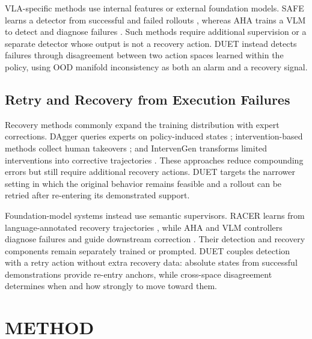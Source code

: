 \documentclass[letterpaper, 10 pt, conference]{ieeeconf}
\begin{document}
VLA-specific methods use internal features or external foundation models. SAFE learns a detector from successful and failed rollouts \cite{safe}, whereas AHA trains a VLM to detect and diagnose failures \cite{aha}. Such methods require additional supervision or a separate detector whose output is not a recovery action. DUET instead detects failures through disagreement between two action spaces learned within the policy, using OOD manifold inconsistency as both an alarm and a recovery signal.

\subsection{Retry and Recovery from Execution Failures}
Recovery methods commonly expand the training distribution with expert corrections. DAgger queries experts on policy-induced states \cite{dagger}; intervention-based methods collect human takeovers \cite{eil,sirius}; and IntervenGen transforms limited interventions into corrective trajectories \cite{intervengen}. These approaches reduce compounding errors but still require additional recovery actions. DUET targets the narrower setting in which the original behavior remains feasible and a rollout can be retried after re-entering its demonstrated support.

Foundation-model systems instead use semantic supervisors. RACER learns from language-annotated recovery trajectories \cite{racer}, while AHA and VLM controllers diagnose failures and guide downstream correction \cite{aha,vlmrecovery}. Their detection and recovery components remain separately trained or prompted. DUET couples detection with a retry action without extra recovery data: absolute states from successful demonstrations provide re-entry anchors, while cross-space disagreement determines when and how strongly to move toward them.

\section{METHOD}
\end{document}
